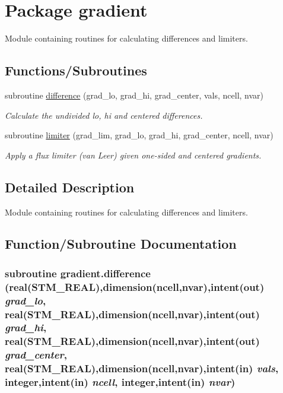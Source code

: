 \hypertarget{a00033}{
\section{Package gradient}
\label{a00033}
}
Module containing routines for calculating differences and limiters.  


\subsection*{Functions/Subroutines}
\begin{CompactItemize}
\item 
subroutine \hyperlink{a00033_2f6957a265ee8b99b78bb9a27a0e64ab}{difference} (grad\_\-lo, grad\_\-hi, grad\_\-center, vals, ncell, nvar)
\begin{CompactList}\small\item\em Calculate the undivided lo, hi and centered differences. \item\end{CompactList}\item 
subroutine \hyperlink{a00033_64ad308bd281dd6315a927bf0f9721da}{limiter} (grad\_\-lim, grad\_\-lo, grad\_\-hi, grad\_\-center, ncell, nvar)
\begin{CompactList}\small\item\em Apply a flux limiter (van Leer) given one-sided and centered gradients. \item\end{CompactList}\end{CompactItemize}


\subsection{Detailed Description}
Module containing routines for calculating differences and limiters. 



\subsection{Function/Subroutine Documentation}
\hypertarget{a00033_2f6957a265ee8b99b78bb9a27a0e64ab}{
\subsubsection[{difference}]{\setlength{\rightskip}{0pt plus 5cm}subroutine gradient.difference (real(STM\_\-REAL),dimension(ncell,nvar),intent(out) {\em grad\_\-lo}, \/  real(STM\_\-REAL),dimension(ncell,nvar),intent(out) {\em grad\_\-hi}, \/  real(STM\_\-REAL),dimension(ncell,nvar),intent(out) {\em grad\_\-center}, \/  real(STM\_\-REAL),dimension(ncell,nvar),intent(in) {\em vals}, \/  integer,intent(in) {\em ncell}, \/  integer,intent(in) {\em nvar})}}
\label{a00033_2f6957a265ee8b99b78bb9a27a0e64ab}


